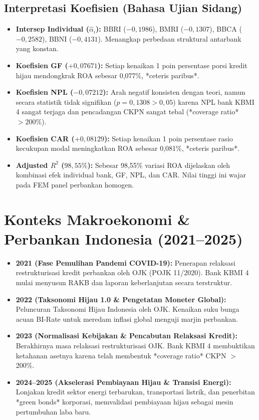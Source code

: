 \documentclass[11pt,a4paper]{article}
\begin{document}
\subsection{Interpretasi Koefisien (Bahasa Ujian Sidang)}
\begin{itemize}
    \item \textbf{Intersep Individual ($\hat{\alpha}_i$):} BBRI ($-0{,}1986$), BMRI ($-0{,}1307$), BBCA ($-0{,}2582$), BBNI ($-0{,}4131$). Menangkap perbedaan struktural antarbank yang konstan.
    \item \textbf{Koefisien GF ($+0{,}07671$):} Setiap kenaikan 1 poin persentase porsi kredit hijau mendongkrak ROA sebesar 0,077\%, *ceteris paribus*.
    \item \textbf{Koefisien NPL ($-0{,}07212$):} Arah negatif konsisten dengan teori, namun secara statistik tidak signifikan ($p = 0{,}1308 > 0{,}05$) karena NPL bank KBMI 4 sangat terjaga dan pencadangan CKPN sangat tebal (*coverage ratio* $> 200\%$).
    \item \textbf{Koefisien CAR ($+0{,}08129$):} Setiap kenaikan 1 poin persentase rasio kecukupan modal meningkatkan ROA sebesar 0,081\%, *ceteris paribus*.
    \item \textbf{Adjusted $R^2$ ($98{,}55\%$):} Sebesar 98,55\% variasi ROA dijelaskan oleh kombinasi efek individual bank, GF, NPL, dan CAR. Nilai tinggi ini wajar pada FEM panel perbankan homogen.
\end{itemize}

\section{Konteks Makroekonomi \& Perbankan Indonesia (2021--2025)}

\begin{itemize}
    \item \textbf{2021 (Fase Pemulihan Pandemi COVID-19):} Penerapan relaksasi restrukturisasi kredit perbankan oleh OJK (POJK 11/2020). Bank KBMI 4 mulai menyusun RAKB dan laporan keberlanjutan secara terstruktur.
    \item \textbf{2022 (Taksonomi Hijau 1.0 \& Pengetatan Moneter Global):} Peluncuran Taksonomi Hijau Indonesia oleh OJK. Kenaikan suku bunga acuan BI-Rate untuk meredam inflasi global menguji marjin perbankan.
    \item \textbf{2023 (Normalisasi Kebijakan \& Pencabutan Relaksasi Kredit):} Berakhirnya masa relaksasi restrukturisasi OJK. Bank KBMI 4 membuktikan ketahanan asetnya karena telah membentuk *coverage ratio* CKPN $>$ 200\%.
    \item \textbf{2024--2025 (Akselerasi Pembiayaan Hijau \& Transisi Energi):} Lonjakan kredit sektor energi terbarukan, transportasi listrik, dan penerbitan *green bonds* korporasi, memvalidasi pembiayaan hijau sebagai mesin pertumbuhan laba baru.
\end{itemize}
\end{document}
